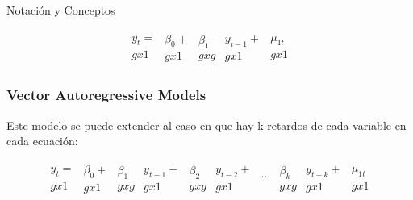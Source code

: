 \documentclass[spanish,xcolor=table]{beamer}
\begin{document}
\begin{section}{Notaci\'on y Conceptos}
\begin{frame}
\begin{gather}
\begin{matrix} y_{t} =       \\ g x 1 \end{matrix}
\begin{matrix} \beta_{0} +\\ g x 1 \end{matrix}
\begin{matrix} \beta_{1}   \\ g x g \end{matrix}
\begin{matrix} y_{t-1} +    \\ g x 1 \end{matrix}
\begin{matrix} \mu_{1t}    \\ g x 1 \end{matrix}
\end{gather}

\end{frame}
\begin{frame}
\frametitle{Vector Autoregressive Models}

Este modelo se puede extender al caso en que hay k retardos de cada variable en cada ecuaci\'on:

\begin{gather}
\begin{matrix} y_{t} =       \\ g x 1 \end{matrix}
\begin{matrix} \beta_{0} +\\ g x 1 \end{matrix}
\begin{matrix} \beta_{1}   \\ g x g \end{matrix}
\begin{matrix} y_{t-1} +    \\ g x 1 \end{matrix}
\begin{matrix} \beta_{2}   \\ g x g \end{matrix}
\begin{matrix} y_{t-2} +    \\ g x 1 \end{matrix}
\begin{matrix} \dots{}    \\  \end{matrix}
\begin{matrix} \beta_{k}   \\ g x g \end{matrix}
\begin{matrix} y_{t-k} +    \\ g x 1 \end{matrix}
\begin{matrix} \mu_{1t}    \\ g x 1 \end{matrix}
\end{gather}


\end{frame}
\end{section}
\end{document}
